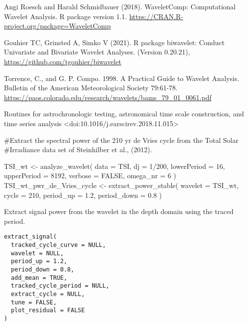 \documentclass[a4paper]{book}
\begin{document}
%
\begin{References}
Angi Roesch and Harald Schmidbauer (2018). WaveletComp: Computational
Wavelet Analysis. R package version 1.1.
\url{https://CRAN.R-project.org/package=WaveletComp}

Gouhier TC, Grinsted A, Simko V (2021). R package biwavelet: Conduct Univariate and Bivariate Wavelet Analyses. (Version 0.20.21),
\url{https://github.com/tgouhier/biwavelet}

Torrence, C., and G. P. Compo. 1998. A Practical Guide to Wavelet Analysis.
Bulletin of the American Meteorological Society 79:61-78.
\url{https://paos.colorado.edu/research/wavelets/bams_79_01_0061.pdf}

Routines for astrochronologic testing, astronomical time scale construction, and
time series analysis <doi:10.1016/j.earscirev.2018.11.015>
\end{References}
%
\begin{Examples}
\begin{ExampleCode}
#Extract the spectral power of the 210 yr de Vries cycle from the Total Solar
#Irradiance data set of Steinhilber et al., (2012).

TSI_wt <-
 analyze_wavelet(
   data = TSI,
   dj = 1/200,
   lowerPeriod = 16,
   upperPeriod = 8192,
   verbose = FALSE,
   omega_nr = 6
 )
TSI_wt_pwr_de_Vries_cycle <-  extract_power_stable(
 wavelet = TSI_wt,
 cycle = 210,
 period_up = 1.2,
 period_down = 0.8
)


\end{ExampleCode}
\end{Examples}
%
\begin{Description}
Extract signal power from the wavelet in the depth domain using the traced period.
\end{Description}
%
\begin{Usage}
\begin{verbatim}
extract_signal(
  tracked_cycle_curve = NULL,
  wavelet = NULL,
  period_up = 1.2,
  period_down = 0.8,
  add_mean = TRUE,
  tracked_cycle_period = NULL,
  extract_cycle = NULL,
  tune = FALSE,
  plot_residual = FALSE
)
\end{verbatim}
\end{Usage}
%
\end{document}
